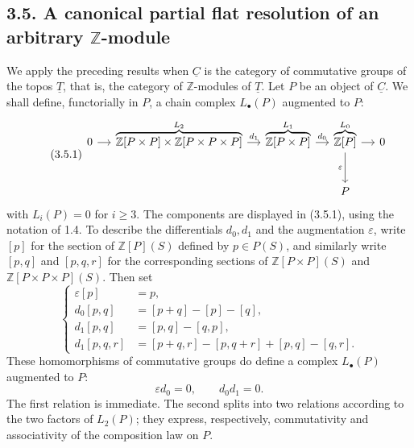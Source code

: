 
\subsection*{3.5. A canonical partial flat resolution of an
arbitrary $\mathbb Z$-module}

We apply the preceding results when $\underline C$ is the category
of commutative groups of the topos $\underline T$, that is, the
category of $\mathbb Z$-modules of $\underline T$.  Let $P$ be an
object of $\underline C$.  We shall define, functorially in $P$, a
chain complex $L_\bullet(P)$ augmented to $P$:
\begin{equation}\tag{3.5.1}
\begin{tikzcd}[column sep=small,row sep=large]
 0\arrow[r]&\overbrace{\mathbb Z[P\times P]\times
   \mathbb Z[P\times P\times P]}^{L_2}
   \arrow[r,"d_1"]
 &\overbrace{\mathbb Z[P\times P]}^{L_1}
   \arrow[r,"d_0"]
 &\overbrace{\mathbb Z[P]}^{L_0}
   \arrow[r]\arrow[d,"\varepsilon"']&0\\
 &&&P&{}
\end{tikzcd}
\end{equation}
with $L_i(P)=0$ for $i\geq3$.  The components are displayed in
(3.5.1), using the notation of 1.4.  To describe the differentials
$d_0,d_1$ and the augmentation $\varepsilon$, write $[p]$ for the
section of $\mathbb Z[P](S)$ defined by $p\in P(S)$, and similarly
write $[p,q]$ and $[p,q,r]$ for the corresponding sections of
$\mathbb Z[P\times P](S)$ and
$\mathbb Z[P\times P\times P](S)$.  Then set
\begin{equation}\tag{3.5.2}
\left\{
\begin{aligned}
 \varepsilon[p]&=p,\\
 d_0[p,q]&=[p+q]-[p]-[q],\\
 d_1[p,q]&=[p,q]-[q,p],\\
 d_1[p,q,r]&=[p+q,r]-[p,q+r]+[p,q]-[q,r].
\end{aligned}
\right.
\end{equation}
These homomorphisms of commutative groups do define a complex
$L_\bullet(P)$ augmented to $P$:
\[
 \varepsilon d_0=0,\qquad d_0d_1=0.
\]
The first relation is immediate.  The second splits into two
relations according to the two factors of $L_2(P)$; they express,
respectively, commutativity and associativity of the composition law
on $P$.

